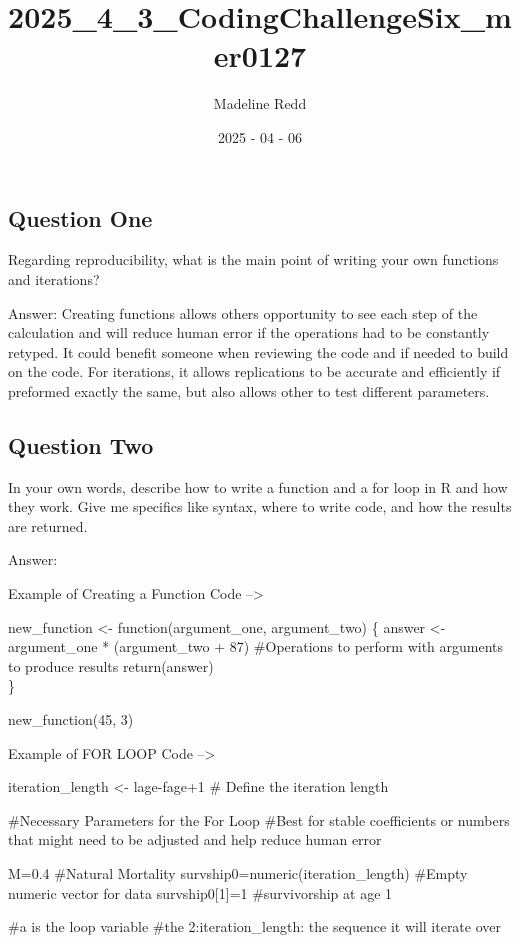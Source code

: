 \documentclass[
  12pt,
]{article}
\title{2025\_4\_3\_CodingChallengeSix\_mer0127}
\author{Madeline Redd}
\date{2025 - 04 - 06}
\begin{document}
\maketitle

\subsection{Question One}\label{question-one}

Regarding reproducibility, what is the main point of writing your own
functions and iterations?

Answer: Creating functions allows others opportunity to see each step of
the calculation and will reduce human error if the operations had to be
constantly retyped. It could benefit someone when reviewing the code and
if needed to build on the code. For iterations, it allows replications
to be accurate and efficiently if preformed exactly the same, but also
allows other to test different parameters.

\subsection{Question Two}\label{question-two}

In your own words, describe how to write a function and a for loop in R
and how they work. Give me specifics like syntax, where to write code,
and how the results are returned.

Answer:

Example of Creating a Function Code --\textgreater{}

new\_function \textless- function(argument\_one, argument\_two) \{
answer \textless- argument\_one * (argument\_two + 87) \#Operations to
perform with arguments to produce results return(answer)\\
\}

new\_function(45, 3)

Example of FOR LOOP Code --\textgreater{}

iteration\_length \textless- lage-fage+1 \# Define the iteration length

\#Necessary Parameters for the For Loop \#Best for stable coefficients
or numbers that might need to be adjusted and help reduce human error

M=0.4 \#Natural Mortality survship0=numeric(iteration\_length) \#Empty
numeric vector for data survship0{[}1{]}=1 \#survivorship at age 1

\#a is the loop variable \#the 2:iteration\_length: the sequence it will
iterate over
\end{document}
